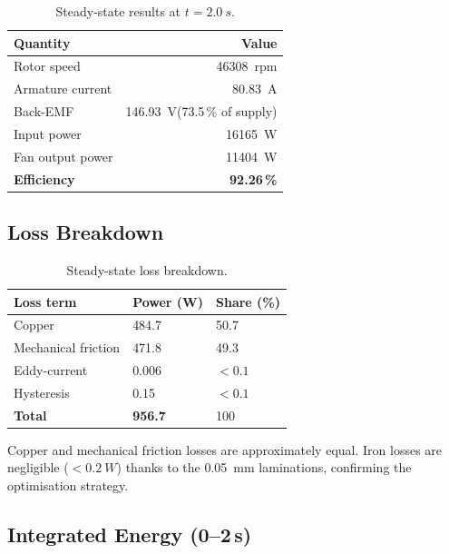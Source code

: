 \documentclass[10pt, twocolumn, a4paper]{article}
\begin{document}
\begin{table}[H]
  \centering
  \caption{Steady-state results at $t = \SI{2.0}{s}$.}
  \label{tab:results}

  \small
  \setlength{\tabcolsep}{6pt}
  \begin{tabular}{@{} L{3.5cm} r @{}}
    \toprule
    \textbf{Quantity} & \textbf{Value} \\
    \midrule
    Rotor speed           & \SI{46308}{rpm} \\
    Armature current      & \SI{80.83}{A} \\
    Back-EMF              & \SI{146.93}{V}\;(73.5\,\% of supply) \\
    Input power           & \SI{16165}{W} \\
    Fan output power      & \SI{11404}{W} \\
    \textbf{Efficiency}   & \textbf{92.26\,\%} \\
    \bottomrule
  \end{tabular}
\end{table}

\subsection{Loss Breakdown}

\begin{table}[H]
  \centering
  \caption{Steady-state loss breakdown.}
  \label{tab:losses}
  \small
  \setlength{\tabcolsep}{6pt}
  \begin{tabular}{@{} L{2.6cm} R{1.6cm} R{1.6cm} @{}}
    \toprule
    \textbf{Loss term} & \textbf{Power (W)} & \textbf{Share (\%)} \\
    \midrule
    Copper              & 484.7  & 50.7 \\
    Mechanical friction & 471.8  & 49.3 \\
    Eddy-current        & 0.006  & $<0.1$ \\
    Hysteresis          & 0.15   & $<0.1$ \\
    \midrule
    \textbf{Total}      & \textbf{956.7} & 100 \\
    \bottomrule
  \end{tabular}
\end{table}

Copper and mechanical friction losses are approximately equal.  Iron
losses are negligible ($<\SI{0.2}{W}$) thanks to the \SI{0.05}{mm}
laminations, confirming the optimisation strategy.

\subsection{Integrated Energy (0--2\,s)}
\end{document}
